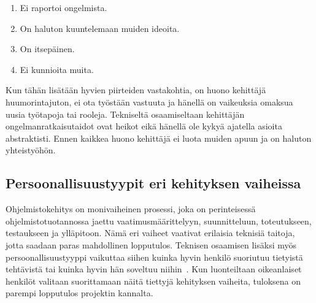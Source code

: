 \documentclass[finnish]{../tktltiki2}
\theoremstyle{definition}
\theoremstyle{remark}
\begin{document}
\begin{enumerate}

\item Ei raportoi ongelmista.
\item On haluton kuuntelemaan muiden ideoita.
\item On itsepäinen.
\item Ei kunnioita muita.

\end{enumerate}

Kun tähän lisätään hyvien piirteiden vastakohtia, on huono kehittäjä huumorintajuton, ei ota työstään vastuuta ja hänellä on vaikeuksia omaksua uusia työtapoja tai rooleja. Tekniseltä osaamiseltaan kehittäjän ongelmanratkaisutaidot ovat heikot eikä hänellä ole kykyä ajatella asioita abstraktisti. Ennen kaikkea huono kehittäjä ei luota muiden apuun ja on haluton yhteistyöhön.\\


\subsection{Persoonallisuustyypit eri kehityksen vaiheissa}

Ohjelmistokehitys on monivaiheinen prosessi, joka on perinteisessä ohjelmistotuotannossa
jaettu vaatimusmäärittelyyn, suunnitteluun, toteutukseen, testaukseen
ja ylläpitoon. Nämä eri vaiheet vaativat erilaisia teknisiä taitoja,
jotta saadaan paras mahdollinen lopputulos. Teknisen
osaamisen lisäksi myös persoonallisuustyyppi vaikuttaa siihen kuinka
hyvin henkilö suoriutuu tietyistä tehtävistä tai kuinka hyvin hän
soveltuu niihin~\cite{Capretz:2010:MSS:1726559.1726574}. Kun luonteiltaan oikeanlaiset henkilöt valitaan suorittamaan
näitä tiettyjä kehityksen vaiheita, tuloksena on parempi lopputulos
projektin kannalta.\\
\end{document}
